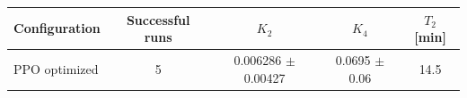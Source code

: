 \begin{tabular}{lcccc}
\toprule
Configuration & Successful runs & $K_2$ & $K_4$ & $T_2$ [min] \\
\midrule
PPO optimized & 5 & 0.006286 $\pm$ 0.00427 & 0.0695 $\pm$ 0.06 & 14.5 \\
\bottomrule
\end{tabular}

